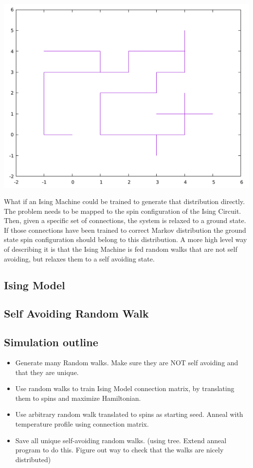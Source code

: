 \documentclass[11pt]{article}
\begin{document}
\includegraphics[scale=0.25]{images/non_saw.pdf}

What if an Ising Machine could be trained to generate that distribution directly. The problem needs to be mapped to the spin configuration of the Ising Circuit. Then, given a specific set of connections, the system is relaxed to a ground state. If those connections have been trained to correct Markov distribution the ground state spin configuration should belong to this distribution. A more high level way of describing it is that the Ising Machine is fed random walks that are not self avoiding, but relaxes them to a self avoiding state.
\subsection{Ising Model}
\subsection{Self Avoiding Random Walk}
\subsection{Simulation outline}
\begin{itemize}
\item Generate many Random walks. Make sure they are NOT self avoiding and that they are unique.
\item Use random walks to train Ising Model connection matrix, by translating them to spins and maximize Hamiltonian.
\item Use arbitrary random walk translated to spins as starting seed. Anneal with temperature profile using connection matrix.
\item Save all unique self-avoiding random walks. (using tree. Extend anneal program to do this. Figure out way to check that the walks are nicely distributed)
\end{itemize}
\end{document}

